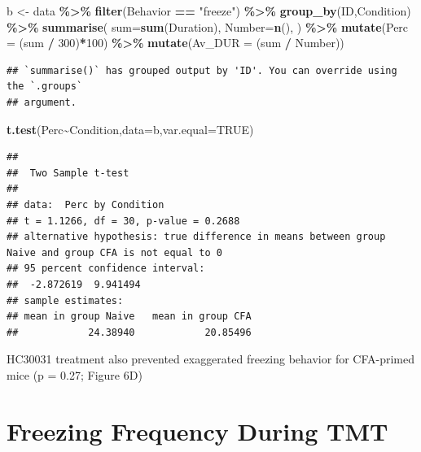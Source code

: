 \documentclass[
]{book}
\newenvironment{Shaded}{\begin{snugshade}}{\end{snugshade}}
\newcommand{\AttributeTok}[1]{\textcolor[rgb]{0.13,0.29,0.53}{#1}}
\newcommand{\ConstantTok}[1]{\textcolor[rgb]{0.56,0.35,0.01}{#1}}
\newcommand{\DecValTok}[1]{\textcolor[rgb]{0.00,0.00,0.81}{#1}}
\newcommand{\FunctionTok}[1]{\textcolor[rgb]{0.13,0.29,0.53}{\textbf{#1}}}
\newcommand{\NormalTok}[1]{#1}
\newcommand{\OtherTok}[1]{\textcolor[rgb]{0.56,0.35,0.01}{#1}}
\newcommand{\SpecialCharTok}[1]{\textcolor[rgb]{0.81,0.36,0.00}{\textbf{#1}}}
\newcommand{\StringTok}[1]{\textcolor[rgb]{0.31,0.60,0.02}{#1}}
\begin{document}
\begin{Shaded}
\begin{Highlighting}[]
\NormalTok{b }\OtherTok{\textless{}{-}}\NormalTok{ data  }\SpecialCharTok{\%\textgreater{}\%}
  \FunctionTok{filter}\NormalTok{(Behavior }\SpecialCharTok{==} \StringTok{"freeze"}\NormalTok{) }\SpecialCharTok{\%\textgreater{}\%}
  \FunctionTok{group\_by}\NormalTok{(ID,Condition) }\SpecialCharTok{\%\textgreater{}\%}
  \FunctionTok{summarise}\NormalTok{(}
    \AttributeTok{sum=}\FunctionTok{sum}\NormalTok{(Duration),}
    \AttributeTok{Number=}\FunctionTok{n}\NormalTok{(),}
\NormalTok{  ) }\SpecialCharTok{\%\textgreater{}\%}
  \FunctionTok{mutate}\NormalTok{(}\AttributeTok{Perc =}\NormalTok{ (sum }\SpecialCharTok{/} \DecValTok{300}\NormalTok{)}\SpecialCharTok{*}\DecValTok{100}\NormalTok{) }\SpecialCharTok{\%\textgreater{}\%}
  \FunctionTok{mutate}\NormalTok{(}\AttributeTok{Av\_DUR =}\NormalTok{ (sum }\SpecialCharTok{/}\NormalTok{ Number)) }
\end{Highlighting}
\end{Shaded}

\begin{verbatim}
## `summarise()` has grouped output by 'ID'. You can override using the `.groups`
## argument.
\end{verbatim}

\begin{Shaded}
\begin{Highlighting}[]
\FunctionTok{t.test}\NormalTok{(Perc}\SpecialCharTok{\textasciitilde{}}\NormalTok{Condition,}\AttributeTok{data=}\NormalTok{b,}\AttributeTok{var.equal=}\ConstantTok{TRUE}\NormalTok{)}
\end{Highlighting}
\end{Shaded}

\begin{verbatim}
## 
##  Two Sample t-test
## 
## data:  Perc by Condition
## t = 1.1266, df = 30, p-value = 0.2688
## alternative hypothesis: true difference in means between group Naive and group CFA is not equal to 0
## 95 percent confidence interval:
##  -2.872619  9.941494
## sample estimates:
## mean in group Naive   mean in group CFA 
##            24.38940            20.85496
\end{verbatim}

HC30031 treatment also prevented exaggerated freezing behavior for CFA-primed mice (p = 0.27; Figure 6D)

\section*{Freezing Frequency During TMT}\label{freezing-frequency-during-tmt}
\end{document}
